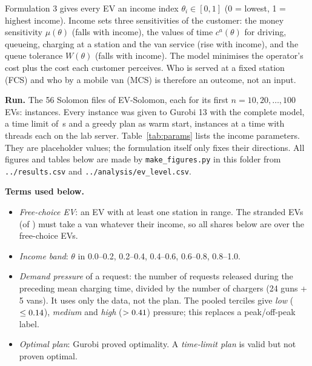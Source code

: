 \documentclass[11pt,a4paper]{article}
\begin{document}
Formulation 3 gives every EV an income index $\theta_i\in[0,1]$ (0 = lowest, 1 = highest income). Income sets three sensitivities of the customer: the money sensitivity $\mu(\theta)$ (falls with income), the values of time $c^{a}(\theta)$ for driving, queueing, charging at a station and the van service (rise with income), and the queue tolerance $W(\theta)$ (falls with income). The model minimises the operator's cost plus the cost each customer perceives. Who is served at a fixed station (FCS) and who by a mobile van (MCS) is therefore an outcome, not an input.

\textbf{Run.} The 56 Solomon files of EV-Solomon, each for its first $n=10,20,\dots,100$ EVs: \NInst{} instances. Every instance was given to Gurobi 13 with the complete model, a time limit of \TimeLimit\,s and a greedy plan as warm start, \Workers{} instances at a time with \Threads{} threads each on the lab server. Table~\ref{tab:params} lists the income parameters. They are placeholder values; the formulation itself only fixes their directions. All figures and tables below are made by \texttt{make\_figures.py} in this folder from \texttt{../results.csv} and \texttt{../analysis/ev\_level.csv}.

\textbf{Terms used below.}
\begin{itemize}
  \item \emph{Free-choice EV}: an EV with at least one station in range. The \NStranded{} stranded EVs (of \NEV) must take a van whatever their income, so all shares below are over the \NFree{} free-choice EVs.
  \item \emph{Income band}: $\theta$ in 0.0--0.2, 0.2--0.4, 0.4--0.6, 0.6--0.8, 0.8--1.0.
  \item \emph{Demand pressure} of a request: the number of requests released during the preceding mean charging time, divided by the number of chargers (24 guns + 5 vans). It uses only the data, not the plan. The pooled terciles give \emph{low} ($\le0.14$), \emph{medium} and \emph{high} ($>0.41$) pressure; this replaces a peak/off-peak label.
  \item \emph{Optimal plan}: Gurobi proved optimality. A \emph{time-limit plan} is valid but not proven optimal.
\end{itemize}

\begin{table}[H]
\centering\small
\caption{Income parameters of the run (straight lines between $\theta=0$ and $\theta=1$).}
\label{tab:params}

\end{table}
\end{document}
